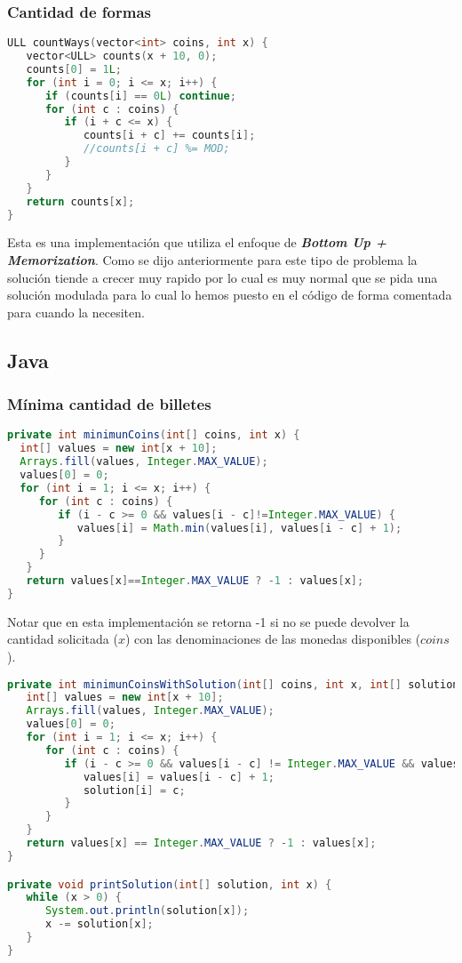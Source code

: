 \subsubsection{Cantidad de formas}

\begin{lstlisting}[language=C++]
ULL countWays(vector<int> coins, int x) {
   vector<ULL> counts(x + 10, 0);
   counts[0] = 1L;
   for (int i = 0; i <= x; i++) {
      if (counts[i] == 0L) continue;
      for (int c : coins) {
         if (i + c <= x) {
            counts[i + c] += counts[i];
            //counts[i + c] %= MOD;
         }
      }
   }
   return counts[x];
}
\end{lstlisting}

Esta es una implementación que utiliza el enfoque de \textbf{\emph{Bottom Up + Memorization}}. Como se dijo anteriormente para este tipo de problema la solución tiende a crecer muy rapido por lo cual es muy normal que se pida una solución modulada para lo cual lo hemos puesto en el código de forma comentada para cuando la necesiten.


\subsection{Java}

\subsubsection{Mínima cantidad de billetes}
\begin{lstlisting}[language=Java]
private int minimunCoins(int[] coins, int x) {
  int[] values = new int[x + 10];
  Arrays.fill(values, Integer.MAX_VALUE);
  values[0] = 0;
  for (int i = 1; i <= x; i++) {
     for (int c : coins) {
        if (i - c >= 0 && values[i - c]!=Integer.MAX_VALUE) {
           values[i] = Math.min(values[i], values[i - c] + 1);
        }
     }
   }
   return values[x]==Integer.MAX_VALUE ? -1 : values[x];
}
\end{lstlisting}

Notar que en esta implementación se retorna -1 si no se puede devolver la cantidad solicitada ($x$) con las denominaciones de las monedas disponibles ($coins$).

\begin{lstlisting}[language=Java]
private int minimunCoinsWithSolution(int[] coins, int x, int[] solution) {
   int[] values = new int[x + 10];
   Arrays.fill(values, Integer.MAX_VALUE);
   values[0] = 0;
   for (int i = 1; i <= x; i++) {
      for (int c : coins) {
         if (i - c >= 0 && values[i - c] != Integer.MAX_VALUE && values[i] > values[i - c] + 1) {
            values[i] = values[i - c] + 1;
            solution[i] = c;
         }
      }
   }
   return values[x] == Integer.MAX_VALUE ? -1 : values[x];
}

private void printSolution(int[] solution, int x) {
   while (x > 0) {
      System.out.println(solution[x]);
      x -= solution[x];
   }
}
\end{lstlisting}

